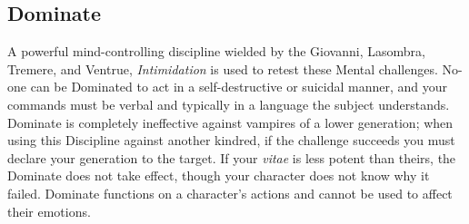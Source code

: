 \subsection{Dominate}
A powerful mind-controlling discipline wielded by the Giovanni, Lasombra, Tremere, and Ventrue, 
\emph{Intimidation} is used to retest these Mental challenges.  No-one can be Dominated to act 
in a self-destructive or suicidal manner, and your commands must be verbal and typically in a 
language the subject understands.  Dominate is completely ineffective against vampires of a 
lower generation; when using this Discipline against another kindred, if the challenge succeeds 
you must declare your generation to the target.  If your \emph{vitae} is less potent than theirs, 
the Dominate does not take effect, though your character does not know why it failed.  Dominate 
functions on a character's actions and cannot be used to affect their emotions.

